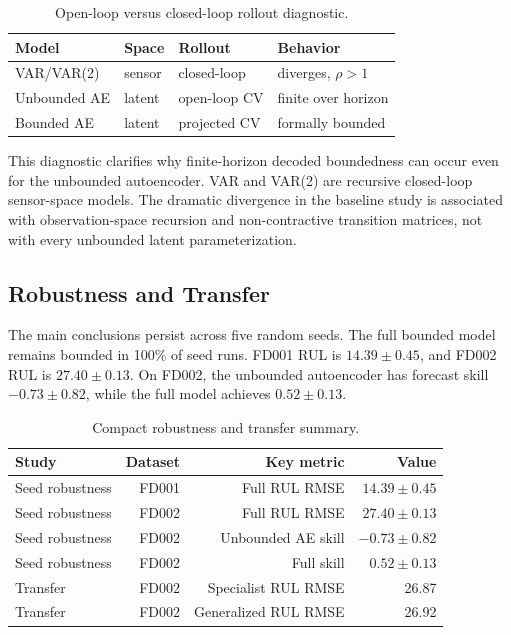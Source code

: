 \documentclass[a4paper,fleqn]{cas-sc}
\newcommand{\tinytable}{\scriptsize}
\newcommand{\verytighttables}{%
  \setlength{\tabcolsep}{3.5pt}%
  \renewcommand{\arraystretch}{1.05}%
}
\begin{document}
\begin{table}[t]
\centering
\caption{Open-loop versus closed-loop rollout diagnostic.}
\label{tab:open-closed}
\tinytable
\verytighttables
\begin{tabular}{@{}llll@{}}
\toprule
Model & Space & Rollout & Behavior \\
\midrule
VAR/VAR(2) & sensor & closed-loop & diverges, $\rho>1$ \\
Unbounded AE & latent & open-loop CV & finite over horizon \\
Bounded AE & latent & projected CV & formally bounded \\
\bottomrule
\end{tabular}
\end{table}

This diagnostic clarifies why finite-horizon decoded boundedness can occur
even for the unbounded autoencoder. VAR and VAR(2) are recursive
closed-loop sensor-space models. The dramatic divergence in the baseline study
is associated with observation-space recursion and non-contractive transition
matrices, not with every unbounded latent parameterization.

\subsection{Robustness and Transfer}

The main conclusions persist across five random seeds. The full bounded model
remains bounded in 100\% of seed runs. FD001 RUL is $14.39\pm0.45$, and FD002
RUL is $27.40\pm0.13$. On FD002, the unbounded autoencoder has forecast skill
$-0.73\pm0.82$, while the full model achieves $0.52\pm0.13$.

\begin{table}[t]
\centering
\caption{Compact robustness and transfer summary.}
\label{tab:robust-transfer}
\tinytable
\verytighttables
\begin{tabular}{@{}lrrr@{}}
\toprule
Study & Dataset & Key metric & Value \\
\midrule
Seed robustness & FD001 & Full RUL RMSE & $14.39\pm0.45$ \\
Seed robustness & FD002 & Full RUL RMSE & $27.40\pm0.13$ \\
Seed robustness & FD002 & Unbounded AE skill & $-0.73\pm0.82$ \\
Seed robustness & FD002 & Full skill & $0.52\pm0.13$ \\
Transfer & FD002 & Specialist RUL RMSE & 26.87 \\
Transfer & FD002 & Generalized RUL RMSE & 26.92 \\
\bottomrule
\end{tabular}
\end{table}
\end{document}
